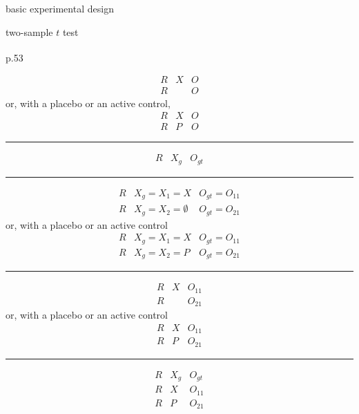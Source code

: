 \documentclass[
]{book}
\theoremstyle{definition}
\theoremstyle{definition}
\theoremstyle{definition}
\theoremstyle{definition}
\theoremstyle{remark}
\begin{document}
basic experimental design

two-sample \(t\) test

\textsuperscript{} p.53

\[
\begin{array}{ccc}
R & X & O\\
R &  & O
\end{array}
\]
or, with a placebo or an active control,
\[
\begin{array}{ccc}
R & X & O\\
R & P & O
\end{array}
\]

\begin{center}\rule{0.5\linewidth}{0.5pt}\end{center}

\[
\begin{array}{ccc}
R & X_{g} & O_{gt}\end{array}
\]

\begin{center}\rule{0.5\linewidth}{0.5pt}\end{center}

\[
\begin{array}{ccc}
R & X_{g}=X_{1}=X & O_{gt}=O_{11}\\
R & X_{g}=X_{2}=\emptyset & O_{gt}=O_{21}
\end{array}
\]
or, with a placebo or an active control
\[
\begin{array}{ccc}
R & X_{g}=X_{1}=X & O_{gt}=O_{11}\\
R & X_{g}=X_{2}=P & O_{gt}=O_{21}
\end{array}
\]

\begin{center}\rule{0.5\linewidth}{0.5pt}\end{center}

\[
\begin{array}{ccc}
R & X & O_{11}\\
R &  & O_{21}
\end{array}
\]
or, with a placebo or an active control
\[
\begin{array}{ccc}
R & X & O_{11}\\
R & P & O_{21}
\end{array}
\]

\begin{center}\rule{0.5\linewidth}{0.5pt}\end{center}

\[
\begin{array}{ccc}
R & X_{g} & O_{gt}\\
R & X & O_{11}\\
R & P & O_{21}
\end{array}
\]
\end{document}
